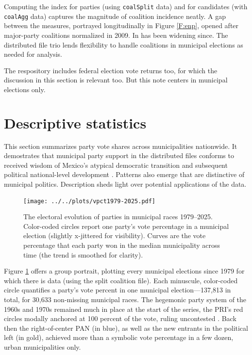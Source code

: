 \documentclass[letter,12pt]{article}
\begin{document}
Computing the \citet{laakso.taagepera.1979} index for parties (using \verb|coalSplit| data) and for candidates (with \verb|coalAgg| data) captures the magnitude of coalition incidence neatly. A gap between the measures, portrayed longitudinally in Figure \ref{F:enp}, opened after major-party coalitions normalized in 2009. In has been widening since. The distributed file trio lends flexibility to handle coalitions in municipal elections as needed for analysis.

The respository includes federal election vote returns too, for which the discussion in this section is relevant too. But this note centers in municipal elections only.

\section{Descriptive statistics}

This section summarizes party vote shares across municipalities nationwide. It demostrates that municipal party support in the distributed files conforms to received wisdom of Mexico's atypical democratic transition \citep[eg.][]{cornelius.1996} and subsequent political national-level development \citep[eg.][]{cornelius.weldonCPT2018}. Patterns also emerge that are distinctive of municipal politics. Description sheds light over potential applications of the data.

\begin{figure}
  \texttt{[image: ../../plots/vpct1979-2025.pdf]}
  \caption{The electoral evolution of parties in municipal races 1979--2025. Color-coded circles report one party's vote percentage in a municipal election (slightly x-jittered for visibility). Curves are the vote percentage that each party won in the median municipality across time (the trend is smoothed for clarity).}\label{F:vpcts}
\end{figure}  

Figure \ref{F:vpcts} offers a group portrait, plotting every municipal elections since 1979 for which there is data (using the split coalition file). Each minuscule, color-coded circle quantifies a party's vote percent in one municipal election---137,813 in total, for 30,633 non-missing municipal races. The hegemonic party system of the 1960s and 1970s remained much in place at the start of the series, the PRI's red circles modally anchored at 100 percent of the vote, ruling uncontested \citep{segovia.els1979}. Back then the right-of-center PAN (in blue), as well as the new entrants in the political left (in gold), achieved more than a symbolic vote percentage in a few dozen, urban municipalities only.
\end{document}
